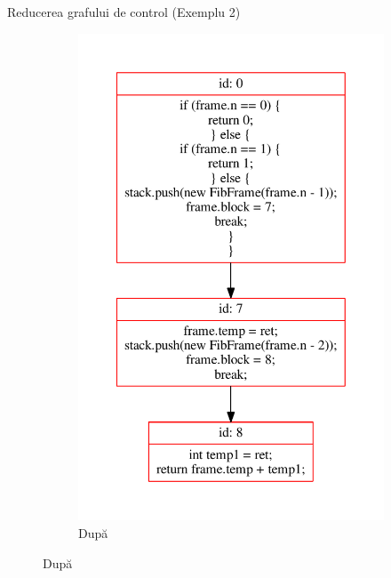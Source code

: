 \documentclass{beamer}
\begin{document}
\begin{frame}{Reducerea grafului de control (Exemplu 2)}
\begin{figure}[htb]
\begin{subfigure}[b]{.4\textwidth}
            \includegraphics[width=\textwidth]{../../../theses/diploma/src/graph/inline-after.pdf}
            \caption{După}
        \end{subfigure}
    \end{figure}
\end{frame}
\end{document}
